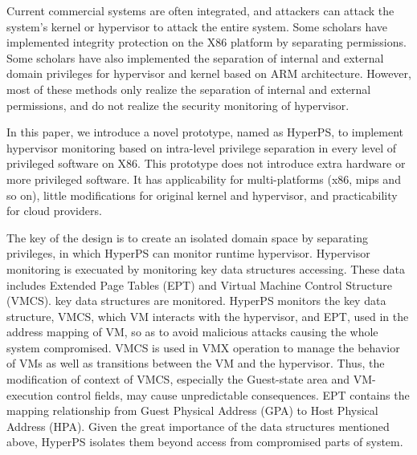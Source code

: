 \documentclass[conference]{IEEEtran}
\begin{document}
Current commercial systems are often integrated, and attackers can attack the system's kernel or hypervisor to attack the entire system. Some scholars have implemented integrity protection on the X86 platform by separating permissions. Some scholars have also implemented the separation of internal and external domain privileges for hypervisor and kernel based on ARM architecture. However, most of these methods only realize the separation of internal and external permissions, and do not realize the security monitoring of hypervisor.


In this paper, we introduce a novel prototype, named as HyperPS, to implement hypervisor monitoring based on intra-level privilege separation in every level of privileged software on X86. This prototype does not introduce extra hardware or more privileged software. It has applicability for multi-platforms (x86, mips and so on), little modifications for original kernel and hypervisor, and practicability for cloud providers.


The key of the design is to create an isolated domain space by separating privileges, in which HyperPS can monitor runtime hypervisor. Hypervisor monitoring is execuated by monitoring key data structures accessing. These data includes Extended Page Tables (EPT) and Virtual Machine Control Structure (VMCS). key data structures are monitored. HyperPS monitors the key data structure, VMCS, which VM interacts with the hypervisor, and EPT, used in the address mapping of VM, so as to avoid malicious attacks causing the whole system compromised. VMCS is used in VMX operation to manage the behavior of VMs as well as transitions between the VM and the hypervisor. Thus, the modification of context of VMCS, especially the Guest-state area and VM-execution control fields, may cause unpredictable consequences. EPT contains the mapping relationship from Guest Physical Address (GPA) to Host Physical Address (HPA). Given the great importance of the data structures mentioned above, HyperPS isolates them beyond access from compromised parts of system.
\end{document}
